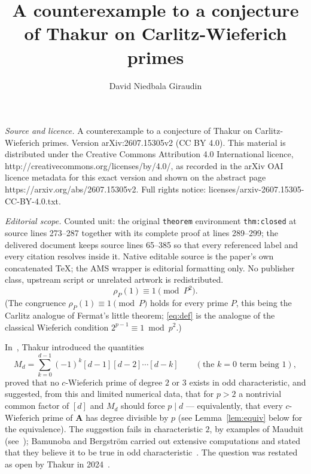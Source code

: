 \documentclass[10pt,a4paper]{amsart}
\newcommand{\A}{\mathbf{A}}
\begin{document}
\title[A counterexample to a conjecture of Thakur on Carlitz-Wiefer]{A counterexample to a conjecture of Thakur on Carlitz-Wieferich primes}
\author{David Niedbala Giraudin}
\date{}
\maketitle
\noindent\emph{Source and licence.} A counterexample to a conjecture of Thakur on Carlitz-Wieferich primes. Version arXiv:2607.15305v2 (CC BY 4.0). This material is distributed under the Creative Commons Attribution 4.0 International licence, http://creativecommons.org/licenses/by/4.0/, as recorded in the arXiv OAI licence metadata for this exact version and shown on the abstract page https://arxiv.org/abs/2607.15305v2. Full rights notice: licenses/arxiv-2607.15305-CC-BY-4.0.txt.\par\smallskip
\noindent\textit{Editorial scope.} Counted unit: the original \texttt{theorem} environment \texttt{thm:closed} at source lines 273--287 together with its complete proof at lines 289--299; the delivered document keeps source lines 65--385 so that every referenced label and every citation resolves inside it. Native editable source is the paper's own concatenated TeX; the AMS wrapper is editorial formatting only. No publisher class, upstream script or unrelated artwork is redistributed.
\begin{equation}\label{eq:def}
\rho_P(1)\equiv1\pmod{P^2}.
\end{equation}
(The congruence $\rho_P(1)\equiv1\pmod P$ holds for every prime $P$, this being
the Carlitz analogue of Fermat's little theorem; \eqref{eq:def} is the analogue
of the classical Wieferich condition $2^{p-1}\equiv1\bmod p^2$.)

In~\cite{Tha15}, Thakur introduced the quantities
\[
M_d=\sum_{k=0}^{d-1}(-1)^k[d-1][d-2]\cdots[d-k]\qquad(\text{the $k=0$ term being }1),
\]
proved that no $c$-Wieferich prime of degree $2$ or $3$ exists in odd
characteristic, and suggested, from this and limited numerical data, that for
$p>2$ a nontrivial common factor of $[d]$ and $M_d$ should force $p\mid d$ ---
equivalently, that every $c$-Wieferich prime of $\A$ has degree divisible by
$p$ (see Lemma~\ref{lem:equiv} below for the equivalence). The suggestion fails
in characteristic $2$, by examples of Mauduit (see~\cite{Tha15,BB});
Bamunoba and Bergstr\"om carried out extensive computations and stated that
they believe it to be true in odd characteristic~\cite{BB}. The question was
restated as open by Thakur in 2024~\cite{Tha24}.
\end{document}
